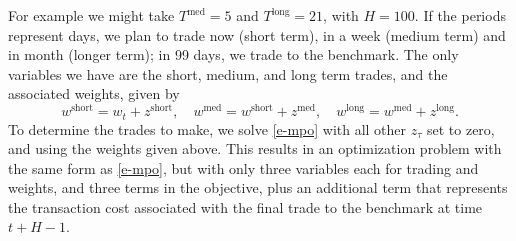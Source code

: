 \documentclass[openany]{now}
\newcommand{\trcosthat}{\hat \phi^\mathrm{trade}}
\renewcommand{\S}{section~}
\begin{document}
For example we might take $T^\mathrm{med}=5$ and
$T^\mathrm{long}=21$, with $H=100$.
If the periods represent days,
we plan to trade now (short term), in a week (medium term)
and in month (longer term); in 99 days, we trade to the benchmark.
The only variables we have
are the short, medium, and long term trades,
and the associated weights, given by
\[
w^\mathrm{short} = w_t + z^\mathrm{short}, \quad
w^\mathrm{med} = w^\mathrm{short} + z^\mathrm{med}, \quad
w^\mathrm{long} = w^\mathrm{med} + z^\mathrm{long}.
\]
To determine the trades to make, we solve \eqref{e-mpo} with
all other $z_\tau$ set to zero, and using the weights given above.
This results in an optimization problem with the same form
as \eqref{e-mpo}, but with only three variables each for trading and
weights, and three terms in the objective, plus an additional
term that represents the transaction cost associated with the final
trade to the benchmark at time $t+H-1$.


\end{document}

